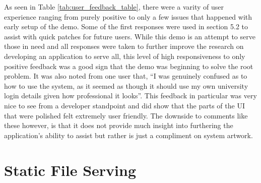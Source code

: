 As seen in Table \ref{tab:user_feedback_table}, there were a varity of user experience ranging from purely positive to only a few issues that happened with early setup of the demo. Some of the first responses were used in section 5.2 to assist with quick patches for future users.
\newline
\newline
While this demo is an attempt to serve those in need and all responses were taken to further improve the research on developing an application to serve all, this level of high responsiveness to only positive feedback was a good sign that the demo was beginning to solve the root problem. It was also noted from one user that, “I was genuinely confused as to how to use the system, as it seemed as though it should use my own university login details given how professional it looks”. This feedback in particular was very nice to see from a developer standpoint and did show that the parts of the UI that were polished felt extremely user friendly. The downside to comments like these however, is that it does not provide much insight into furthering the application’s ability to assist but rather is just a compliment on system artwork.
 
\section{Static File Serving}

